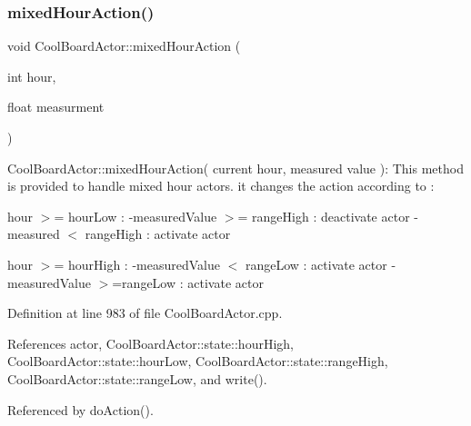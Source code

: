 \subsubsection{\texorpdfstring{mixed\+Hour\+Action()}{mixedHourAction()}}
{\footnotesize\ttfamily void Cool\+Board\+Actor\+::mixed\+Hour\+Action (\begin{DoxyParamCaption}\item[{int}]{hour,  }\item[{float}]{measurment }\end{DoxyParamCaption})}

Cool\+Board\+Actor\+::mixed\+Hour\+Action( current hour, measured value )\+: This method is provided to handle mixed hour actors. it changes the action according to \+:

hour $>$= hour\+Low \+: -\/measured\+Value $>$= range\+High \+: deactivate actor -\/measured $<$ range\+High \+: activate actor

hour $>$= hour\+High \+: -\/measured\+Value $<$ range\+Low \+: activate actor -\/measured\+Value $>$=range\+Low \+: activate actor 

Definition at line 983 of file Cool\+Board\+Actor.\+cpp.



References actor, Cool\+Board\+Actor\+::state\+::hour\+High, Cool\+Board\+Actor\+::state\+::hour\+Low, Cool\+Board\+Actor\+::state\+::range\+High, Cool\+Board\+Actor\+::state\+::range\+Low, and write().



Referenced by do\+Action().

